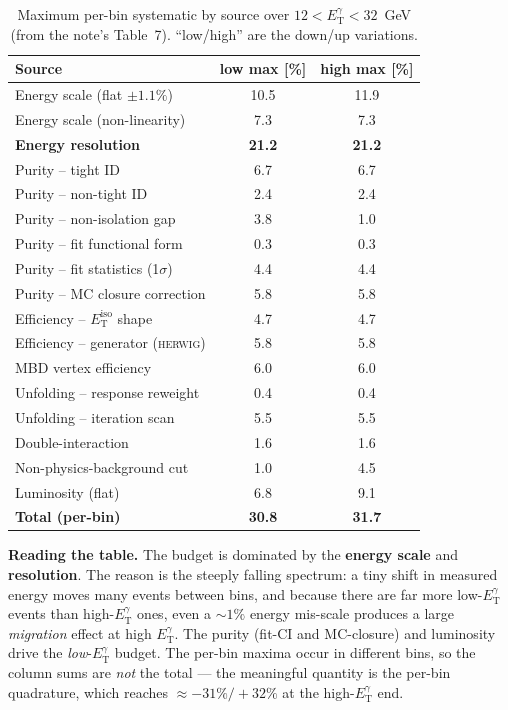 \documentclass[11pt]{article}
\newlength{\calloutwd}
\newenvironment{bgbox}{%
  \par\vspace{6pt}\noindent
  \setlength{\fboxsep}{8pt}%
  \begingroup\color{black}%
  \def\calloutbg{boxblue}\def\calloutline{bgblueline}%
  \fcolorbox{bgblueline}{boxblue}\bgroup
  \begin{minipage}{\calloutwd}}
  {\end{minipage}\egroup\endgroup\par\vspace{6pt}}
\newcommand{\ETg}{E_{\mathrm{T}}^{\gamma}}
\newcommand{\Eiso}{E_{\mathrm{T}}^{\mathrm{iso}}}
\begin{document}
\begin{table}[h]
\centering
\caption{Maximum per-bin systematic by source over $12<\ETg<32$~GeV (from the note's Table~7).
``low/high'' are the down/up variations.}
\label{tab:syst}
\begin{tabular}{lcc}
\toprule
Source & low max [\%] & high max [\%] \\
\midrule
Energy scale (flat $\pm1.1\%$)     & 10.5 & 11.9 \\
Energy scale (non-linearity)       & 7.3  & 7.3  \\
\textbf{Energy resolution}         & \textbf{21.2} & \textbf{21.2} \\
Purity -- tight ID                 & 6.7  & 6.7  \\
Purity -- non-tight ID             & 2.4  & 2.4  \\
Purity -- non-isolation gap        & 3.8  & 1.0  \\
Purity -- fit functional form      & 0.3  & 0.3  \\
Purity -- fit statistics (1$\sigma$)& 4.4 & 4.4  \\
Purity -- MC closure correction    & 5.8  & 5.8  \\
Efficiency -- $\Eiso$ shape        & 4.7  & 4.7  \\
Efficiency -- generator (\textsc{herwig}) & 5.8 & 5.8 \\
MBD vertex efficiency              & 6.0  & 6.0  \\
Unfolding -- response reweight     & 0.4  & 0.4  \\
Unfolding -- iteration scan        & 5.5  & 5.5  \\
Double-interaction                 & 1.6  & 1.6  \\
Non-physics-background cut         & 1.0  & 4.5  \\
Luminosity (flat)                  & 6.8  & 9.1  \\
\midrule
\textbf{Total (per-bin)}           & \textbf{30.8} & \textbf{31.7} \\
\bottomrule
\end{tabular}
\end{table}

\begin{bgbox}
\textbf{Reading the table.} The budget is dominated by the \textbf{energy scale} and
\textbf{resolution}. The reason is the steeply falling spectrum: a tiny shift in measured energy
moves many events between bins, and because there are far more low-$\ETg$ events than high-$\ETg$
ones, even a $\sim1\%$ energy mis-scale produces a large \emph{migration} effect at high $\ETg$.
The purity (fit-CI and MC-closure) and luminosity drive the \emph{low}-$\ETg$ budget. The per-bin
maxima occur in different bins, so the column sums are \emph{not} the total --- the meaningful
quantity is the per-bin quadrature, which reaches $\approx -31\%/+32\%$ at the high-$\ETg$ end.
\end{bgbox}
\end{document}
